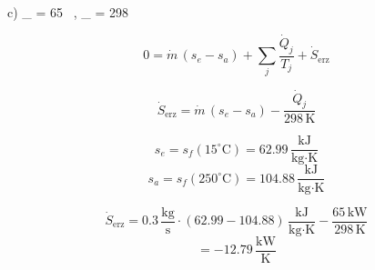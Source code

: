 c) \quad {}_{} = 65 \, , \quad {}_{} = 298 \, 

\[
0 = \dot{m} \, (s_e - s_a) + \sum_j \frac{\dot{Q}_j}{T_j} + \dot{S}_{\text{erz}}
\]

\[
\dot{S}_{\text{erz}} = \dot{m} \, (s_e - s_a) - \frac{\dot{Q}_j}{298 \, \text{K}}
\]

\[
s_e = s_f (15^\circ \text{C}) = 62.99 \, \frac{\text{kJ}}{\text{kg} \cdot \text{K}}
\]
\[
s_a = s_f (250^\circ \text{C}) = 104.88 \, \frac{\text{kJ}}{\text{kg} \cdot \text{K}}
\]

\[
\dot{S}_{\text{erz}} = 0.3 \, \frac{\text{kg}}{\text{s}} \cdot (62.99 - 104.88) \, \frac{\text{kJ}}{\text{kg} \cdot \text{K}} - \frac{65 \, \text{kW}}{298 \, \text{K}}
\]
\[
= -12.79 \, \frac{\text{kW}}{\text{K}}
\]